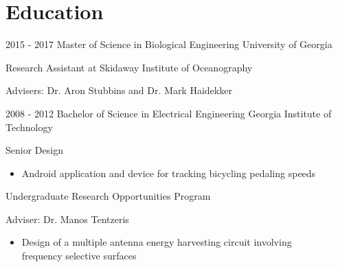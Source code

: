 \documentclass[]{resume}
\begin{document}
\newpage
\section{Education}
    \begin{entrylist}
      \entry
        {2015 - 2017}
        {Master of Science in Biological Engineering}
        {University of Georgia}
        {Research Assistant at Skidaway Institute of Oceanography
        \begin{description}
        \item Advisers: Dr. Aron Stubbins and Dr. Mark Haidekker
        \end{description}}
      \entry
        {2008 - 2012}
        {Bachelor of Science in Electrical Engineering}
        {Georgia Institute of Technology}
        {Senior Design
        \begin{itemize}
        \item Android application and device for tracking bicycling pedaling speeds
        \end{itemize}
        Undergraduate Research Opportunities Program
        \begin{description}
        \item Adviser: Dr. Manos Tentzeris
        \end{description}
        \begin{itemize}
        \item Design of a multiple antenna energy harvesting circuit involving\\ frequency selective surfaces \end{itemize}
        }
    \end{entrylist}
\end{document}

